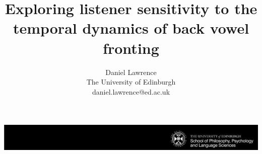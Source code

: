 \documentclass[a0,portrait]{a0poster}
\title{\Huge{Exploring listener sensitivity to the temporal dynamics of back vowel fronting}}
\author{Daniel Lawrence\\The University of Edinburgh\\\hspace{0.5cm}daniel.lawrence@ed.ac.uk}
\begin{document}
\hspace{-4cm}								%
\vspace{-2cm}
\includegraphics{Black_Landscape.pdf}

\begin{minipage}{1191mm}					%
\vspace{-18cm}
\maketitle
\end{minipage}
\vspace{.5cm}
\end{document}
